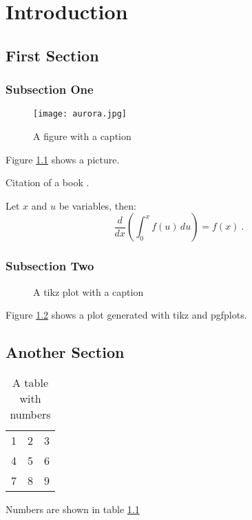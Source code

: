\chapter{Introduction}

\section{First Section}

\subsection{Subsection One}

\begin{figure}
\centering
\texttt{[image: aurora.jpg]}
\caption{A figure with a caption}
\label{fig:aurora}
\end{figure}

Figure \ref{fig:aurora} shows a picture.

Citation of a book \cite{hartley2004}.

Let $x$ and $u$ be variables, then:
\begin{equation}
\frac{d}{dx} \left( \int_{0}^{x} f(u)\,du \right) = f(x) ~.
\end{equation}

\lipsum[1-2]

\subsection{Subsection Two}

\begin{figure}
\centering

\caption{A tikz plot with a caption}
\label{fig:plot}
\end{figure}

Figure \ref{fig:plot} shows a plot generated with tikz and pgfplots.

\lipsum[4-5]

\section{Another Section}

\begin{table}
\centering
\begin{tabular}{ l | c || r }
  1 & 2 & 3 \\
  4 & 5 & 6 \\
  7 & 8 & 9 \\
\end{tabular}
\caption{A table with numbers}
\label{tab:numbers}
\end{table}

Numbers are shown in table \ref{tab:numbers}

\lipsum[6-12]